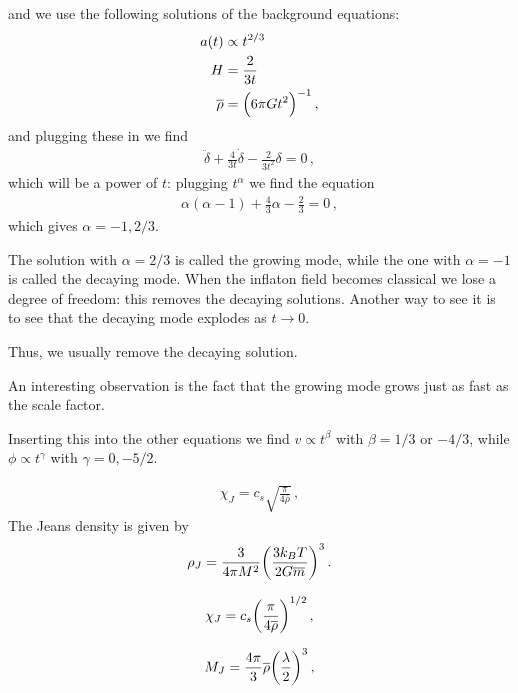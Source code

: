 \documentclass[main.tex]{subfiles}
\begin{document}
and we use the following solutions of the background equations: 
%
\begin{subequations}
\begin{align}
  a(t ) &\propto t^{2/3}  \\
  H &= \frac{2}{3t}  \\
\overline{\rho} &= \qty(6 \pi G t^2)^{-1}
\,,
\end{align}
\end{subequations}
%
and plugging these in we find 
%
\begin{align}
  \ddot{\delta} + \frac{4}{3t} \dot{\delta} - \frac{2}{3t^2} \delta = 0
\,,
\end{align}
%
which will be a power of \(t\): plugging \(t^{\alpha }\) we find the equation 
%
\begin{align}
  \alpha (\alpha -1) + \frac{4}{3} \alpha - \frac{2}{3} =0 
\,,
\end{align}
%
which gives \(\alpha = -1, 2/3\). 

The solution with \(\alpha = 2/3\) is called the growing mode, while the one with \(\alpha = -1\) is called the decaying mode. 
When the inflaton field becomes classical we lose a degree of freedom: this removes the decaying solutions. 
Another way to see it is to see that the decaying mode explodes as \(t \rightarrow 0\). 

Thus, we usually remove the decaying solution. 

An interesting observation is the fact that the growing mode grows just as fast as the scale factor. 

Inserting this into the other equations we find \(v \propto t^{\beta } \) with \(\beta = 1/3\) or \(-4/3\), while \(\phi \propto t^{\gamma }\) with \(\gamma = 0, -5/2\). 

%
\begin{align}
    \chi_{J} = c_s \sqrt{\frac{\pi}{4 \overline{\rho}}}
  \,,
  \end{align}
%
The Jeans density is given by 
%
\begin{align}
  \rho_{J} = \frac{3}{4 \pi M^2} \qty(\frac{3k_B T}{2G \overline{m}})^{3}
\,.
\end{align}
%

%
\begin{align}
  \chi_J = c_s \qty(\frac{\pi}{4 \overline{\rho}})^{1/2}
\,,
\end{align}
%

%
\begin{align}
  M_J = \frac{4 \pi }{3} \overline{\rho} \qty(\frac{\lambda}{2})^{3}
\,,
\end{align}
%
\end{document}
